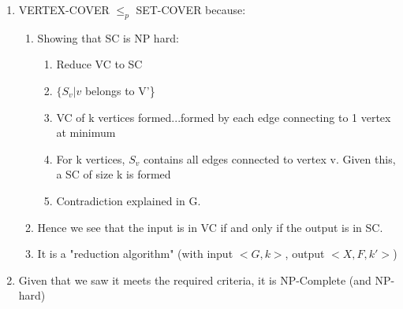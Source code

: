 \documentclass[11pt]{article}
\begin{document}
\begin{enumerate}
\begin{enumerate}
        \item VERTEX-COVER $\leq_p$ SET-COVER because:
        \begin{enumerate}
            \item Showing that SC is NP hard:
            \begin{enumerate}
                \item Reduce VC to SC
                \item $\{S_v|v$ belongs to V'\}
                \item VC of k vertices formed...formed by each edge connecting to 1 vertex at minimum
                \item For k vertices, $S_v$ contains all edges connected to vertex v. Given this, a SC of size k is formed
                \item Contradiction explained in G.
            \end{enumerate}
            \item Hence we see that the input is in VC if and only if the output is in SC.
            \item It is  a "reduction algorithm" (with input $<G,k>$, output $<X,F,k'>$)
        \end{enumerate}
        \item Given that we saw it meets the required criteria, it is NP-Complete (and NP-hard)
    \end{enumerate}
    
\end{enumerate}
\pagebreak
\end{document}
